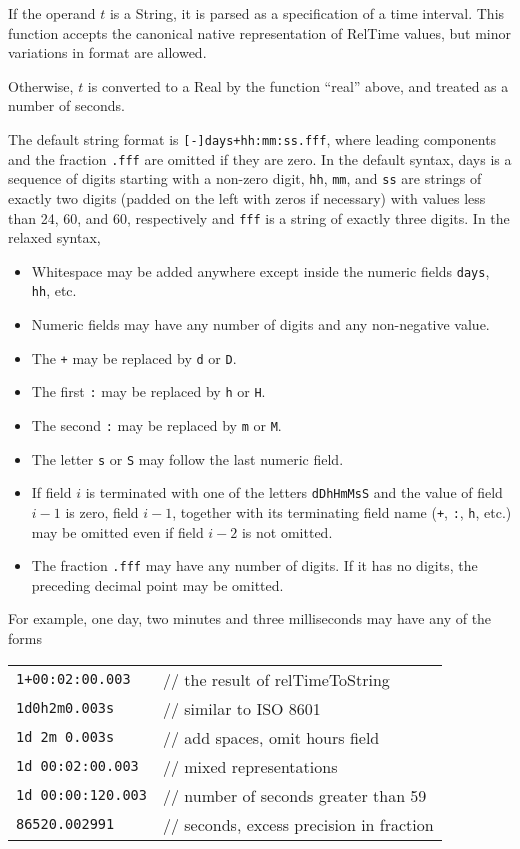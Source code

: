 \documentclass{article}
\begin{document}
\begin{description}
If the operand $t$ is a String, it is parsed as a specification of a time
interval.  This function accepts the canonical native representation of RelTime
values, but minor variations in format are allowed.

Otherwise, $t$ is converted to a Real by the function ``real'' above,
and treated as a number of seconds.

The default string format is \verb/[-]days+hh:mm:ss.fff/, where
leading components and the fraction \verb/.fff/ are omitted if they are zero.
In the default syntax, days is a sequence of digits starting with a
non-zero digit, \verb/hh/, \verb/mm/, and \verb/ss/ are strings of exactly two
digits (padded on the left with zeros if necessary) with values less than 24,
60, and 60, respectively and \verb/fff/ is a string of exactly three digits.
In the relaxed syntax,

\begin{itemize}
\item Whitespace may be added anywhere except inside the numeric fields
\verb/days/, \verb/hh/, etc.
\item Numeric fields may have any number of digits and any non-negative value.
\item The \verb/+/ may be replaced by \verb/d/ or \verb/D/.
\item The first \verb/:/ may be replaced by \verb/h/ or \verb/H/.
\item The second \verb/:/ may be replaced by \verb/m/ or \verb/M/.
\item The letter \verb/s/ or \verb/S/ may follow the last numeric field.
\item If field $i$ is terminated with one of the letters \verb/dDhHmMsS/ and
the value of field $i-1$ is zero, field $i-1$, together with its
terminating field name (\verb/+/, \verb/:/, \verb/h/, etc.) may be omitted even
if field $i-2$ is not omitted.
\item The fraction \verb/.fff/ may have any number of digits.  If it has no
digits, the preceding decimal point may be omitted.
\end{itemize}

For example, one day, two minutes and three milliseconds may have any of
the forms

\begin{tabular}{ll}
\verb/1+00:02:00.003/      & // the result of relTimeToString \\
\verb/1d0h2m0.003s/        & // similar to ISO 8601 \\
\verb/1d 2m 0.003s/        & // add spaces, omit hours field \\
\verb/1d 00:02:00.003/     & // mixed representations \\
\verb/1d 00:00:120.003/    & // number of seconds greater than 59 \\
\verb/86520.002991/        & // seconds, excess precision in fraction
\end{tabular}


\end{description}
\end{document}
